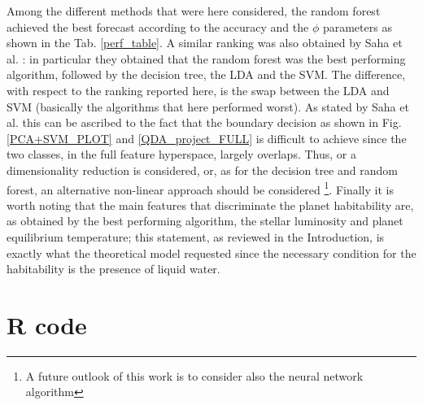 \documentclass[
12pt, %
a4paper, %
oneside, %
headinclude,footinclude, %
BCOR5mm, %
]{scrartcl}
\begin{document}
Among the different methods that were here considered, the random forest achieved the best forecast according to the accuracy and the $\phi$ parameters as shown in the Tab. \ref{perf_table}. A similar ranking was also obtained by Saha et al. \cite{saha2018machine}: in particular they obtained that the random forest was the best performing algorithm, followed by the decision tree, the LDA and the SVM. The difference, with respect to the ranking reported here, is the swap between the LDA and SVM (basically the algorithms that here performed worst). As stated by Saha et al. \cite{saha2018machine} this can be ascribed to the fact that the boundary decision as shown in Fig. \ref{PCA+SVM_PLOT} and  \ref{QDA_project_FULL} is difficult to achieve since the two classes, in the full feature hyperspace, largely overlaps. Thus, or a dimensionality reduction is considered, or, as for the decision tree and random forest, an alternative non-linear approach should be considered \footnote{A future outlook of this work is to consider also the neural network algorithm}. Finally it is worth noting that the main features that discriminate the planet habitability are, as obtained by the best performing algorithm, the stellar luminosity and planet equilibrium temperature; this statement, as reviewed in the Introduction, is exactly what the theoretical model requested since the necessary condition for the habitability is the presence of liquid water. 




\section{R code}







\renewcommand{\refname}{\spacedlowsmallcaps{References}} %




\end{document}
